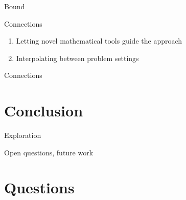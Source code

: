 \documentclass{beamer}
\begin{document}
\begin{frame}{Bound}
\end{frame}
\begin{frame}{Connections}
  \begin{enumerate}
  \item
    Letting novel mathematical tools guide the approach
  \item 
    Interpolating between problem settings
  \end{enumerate}
\end{frame}{Connections}

\section{Conclusion}
\begin{frame}{Exploration}
\end{frame}
\begin{frame}{Open questions, future work}
\end{frame}

\section{Questions}
\end{document}
